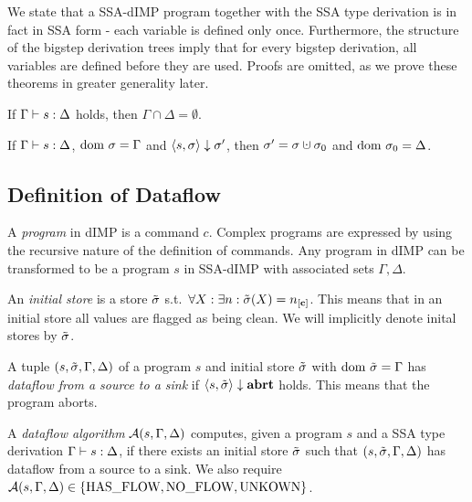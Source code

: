 We state that a SSA-dIMP program together with the SSA type derivation
is in fact in SSA form - each variable is defined only once.
Furthermore, the structure of the bigstep derivation trees imply that 
for every bigstep derivation, all variables are defined before they are used.
Proofs are omitted, as we prove these theorems in greater generality later.

\begin{theorem}
    \label{thm:ssa-gamma-delta-disjoint}
    If $\Gamma \vdash {s}: \Delta$ holds, then $\Gamma \cap \Delta = \emptyset$.
\end{theorem}

\begin{theorem}
    \label{thm:ssa-progress}
    If $\Gamma \vdash {s}: \Delta$, $\text{dom } \sigma = \Gamma$ and
    $\langle s, \sigma \rangle \downarrow \sigma'$, then $\store' = \store \dunion \store_0$
    and $\text{dom }{\sigma_0} = \Delta$.
\end{theorem}

\subsection{Definition of Dataflow}
\begin{definition}[Program]
    A \emph{program} in dIMP is a command $c$.
    Complex programs are expressed by using the recursive nature of
    the definition of commands.
    Any program in dIMP can be transformed to be a program $s$ in SSA-dIMP with associated
    sets $\Gamma, \Delta$.
\end{definition}

\begin{definition}
    An \emph{initial store} is a store $\tilde{\sigma}$ s.t.\ 
    $\forall X: \exists n: \initialstore(X) = \clean[n]$.
    This means that in an initial store all values are flagged as being clean.
    We will implicitly denote inital stores by $\tilde{\sigma}$.
\end{definition}

\begin{definition}[Dataflow]
    A tuple $(s, \tilde{\sigma}, \Gamma, \Delta)$ of a program $s$ and initial store $\tilde{\sigma}{}$ 
    with $\text{dom }{\tilde{\sigma}{}} = \Gamma$
    has \emph{dataflow from a source to a sink} if
    $\langle s, \tilde{\sigma}{} \rangle \downarrow \textbf{abrt}$ holds.
    This means that the program aborts.
\end{definition}

\begin{definition}
    A \emph{dataflow algorithm} $\operatorname{\mathcal{A}}(s, \Gamma, \Delta)$ computes, given a program $s$
    and a SSA type derivation $\Gamma \vdash {s}: \Delta$,
    if there exists an initial store $\tilde{\sigma}{}$ 
    such that $(s, \tilde{\sigma}, \Gamma, \Delta)$ has dataflow from a source to a sink.
    We also require $\operatorname{\mathcal{A}}(s, \Gamma, \Delta) \in \{\text{HAS\_FLOW}, \text{NO\_FLOW}, \text{UNKOWN}\}$.
\end{definition}

